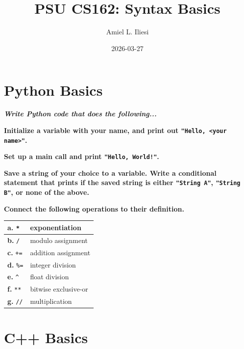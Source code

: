 \documentclass[letterpaper, 12pt]{article}
\title{PSU CS162: Syntax Basics}
\author{Amiel L. Iliesi}
\date{2026-03-27}
\newcommand{\question}[2][2em]{\textbf{#2}\vspace{#1}\par}
\begin{document}
\maketitle

\tableofcontents

\pagebreak

\section{Python Basics}

\textbf{\emph{Write Python code that does the following...}}

\vspace{2em}

\question[5em]{Initialize a variable with your name, and print out
    \texttt{"Hello, <your name>"}.}

\question[8em]{Set up a main call and print \texttt{"Hello, World!"}.}

\question[12em]{Save a string of your choice to a variable. Write a conditional statement
    that prints if the saved string is either \texttt{"String A"},
    \texttt{"String B"}, or none of the above.}


\begin{minipage}{\textwidth}
\question{Connect the following operations to their definition.}
\begin{tabularx}{0.95\linewidth}{| X | X |}
    \hline
    \textbf{a.} \texttt{*} & exponentiation \\
    \hline
    \textbf{b.} \texttt{/} & modulo assignment \\
    \hline
    \textbf{c.} \texttt{+=} & addition assignment \\
    \hline
    \textbf{d.} \texttt{\%=} & integer division \\
    \hline
    \textbf{e.} \texttt{\^} & float division \\
    \hline
    \textbf{f.} \texttt{**} & bitwise exclusive-or \\
    \hline
    \textbf{g.} \texttt{//} & multiplication \\
    \hline
\end{tabularx}
\end{minipage}

\pagebreak

\section{C++ Basics}
\end{document}

